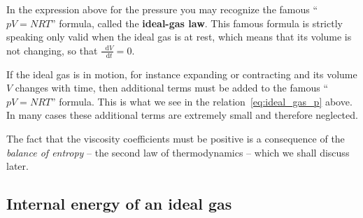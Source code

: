 \documentclass[a4paper,12pt,%
onecolumn,oneside,%
british%
]{memoir}
\newcommand*{\di}{\mathop{}\!\mathrm{d}}%
\renewcommand*{\|}[1][]{\nonscript\:#1\vert\nonscript\:\mathopen{}}
\newcommand*{\dt}{\di t}
\begin{document}
In the expression above for the pressure you may recognize the famous \enquote{$pV=NRT$} formula, called the \textbf{ideal-gas law}. This famous formula is strictly speaking only valid when the ideal gas is at rest, which means that its volume is not changing, so that $\frac{\di V}{\dt} = 0$.
%
%

If the ideal gas is in motion, for instance expanding or contracting and its volume $V$ changes with time, then additional terms must be added to the famous \enquote{$pV=NRT$} formula. This is what we see in the relation~\eqref{eq:ideal_gas_p} above. In many cases these additional terms are extremely small and therefore neglected.

The fact that the viscosity coefficients must be positive is a consequence of the \emph{balance of entropy} -- the second law of thermodynamics -- which we shall discuss later.


\subsection{Internal energy of an ideal gas}
\label{sec:intenergy_ideal_gas}
\end{document}
